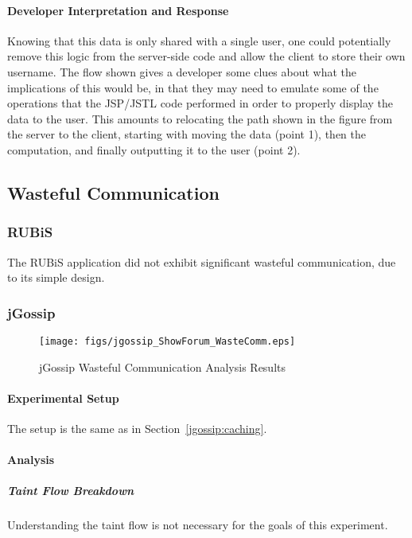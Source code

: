 \documentclass[msc,oneside]{ubcthesis}
\begin{document}
\paragraph{Developer Interpretation and Response}
Knowing that this data is only shared with a single user, one could potentially remove this logic from the server-side code and allow the client to store their own username. The flow shown gives a developer some clues about what the implications of this would be, in that they may need to emulate some of the operations that the JSP/JSTL code performed in order to properly display the data to the user. This amounts to relocating the path shown in the figure from the server to the client, starting with moving the data (point 1), then the computation, and finally outputting it to the user (point 2).

\subsection{Wasteful Communication}
\label{ana:waste}
\subsubsection{RUBiS}

The RUBiS application did not exhibit significant wasteful communication, due to its simple design.

\subsubsection{jGossip} 

\begin{sidewaysfigure}
\centering
\scalebox{0.2}
{\texttt{[image: figs/jgossip\_ShowForum\_WasteComm.eps]}}
\caption{jGossip Wasteful Communication Analysis Results} 
\label{fig:showforumcomm}
\end{sidewaysfigure}

\paragraph{Experimental Setup}
The setup is the same as in Section~\ref{jgossip:caching}.

\paragraph{Analysis}
\subparagraph{Taint Flow Breakdown}
Understanding the taint flow is not necessary for the goals of this experiment.
\end{document}
